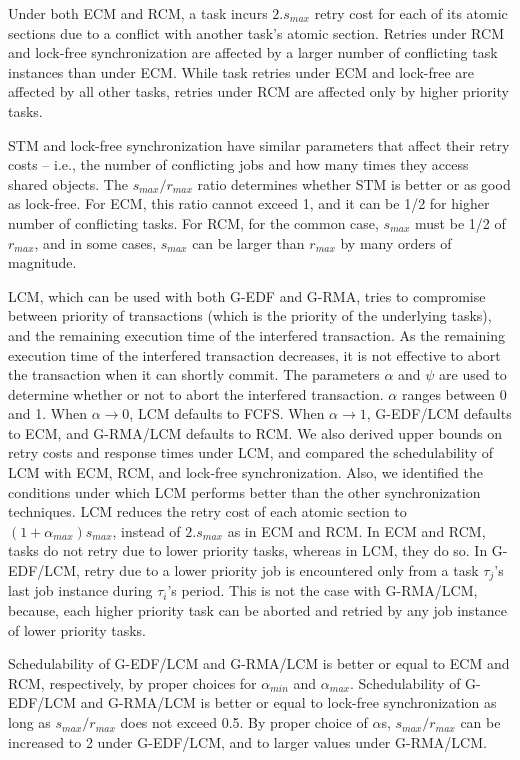 \documentclass[12pt,english]{report}
\begin{document}
Under both ECM and RCM, a task incurs $2.s_{max}$ retry cost for each of its atomic sections due to a conflict with another task's atomic section. Retries under RCM and lock-free synchronization are affected by a larger number of conflicting task instances than under ECM. While task retries under ECM and lock-free are affected by all other tasks, retries under RCM are affected only by higher priority tasks. 

STM and lock-free synchronization have similar parameters that affect their retry costs -- i.e., the number of conflicting jobs and how many times they access shared objects. The $s_{max}/r_{max}$ ratio determines whether STM is better or as good as lock-free. For ECM, this ratio cannot exceed 1, and it can be 1/2 for higher number of conflicting tasks. For RCM, for the common case, $s_{max}$ must be 1/2 of $r_{max}$, and in some cases, $s_{max}$ can be larger than $r_{max}$ by many orders of magnitude.

LCM, which can be used with both G-EDF and G-RMA, tries to compromise between priority of transactions (which is the priority of the underlying tasks), and the remaining execution time of the interfered transaction. As the remaining execution time of the interfered transaction decreases, it is not effective to abort the transaction when it can shortly commit. The parameters $\alpha$ and $\psi$ are used to determine whether or not to abort the interfered transaction. $\alpha$ ranges between 0 and 1. When $\alpha \rightarrow 0$, LCM defaults to FCFS. When $\alpha\rightarrow1$, G-EDF/LCM defaults to ECM, and G-RMA/LCM defaults to RCM. We also derived upper bounds on retry costs and response times under LCM, and compared the schedulability of LCM with ECM, RCM, and lock-free synchronization. Also, we identified the conditions under which LCM performs better than the other synchronization techniques. LCM reduces the retry cost  of each atomic section to $(1+\alpha_{max})s_{max}$, instead of $2.s_{max}$ as in ECM and RCM. In ECM and RCM, tasks do not retry due to lower priority tasks, whereas in LCM, they do so. In G-EDF/LCM, retry due to a lower priority job is encountered only from a task $\tau_{j}$'s last job instance during $\tau_{i}$'s period. This is not the case with G-RMA/LCM, because,  each higher priority task can be aborted and retried by any job instance of lower priority tasks. 

Schedulability of G-EDF/LCM and G-RMA/LCM is better or equal to ECM and RCM, respectively, by proper choices for $\alpha_{min}$ and $\alpha_{max}$. Schedulability of G-EDF/LCM and G-RMA/LCM is better or equal to lock-free synchronization as long as $s_{max}/r_{max}$ does not exceed 0.5. By proper choice of $\alpha$s, $s_{max}/r_{max}$ can be increased to 2 under G-EDF/LCM, and to larger values under G-RMA/LCM.
\end{document}
